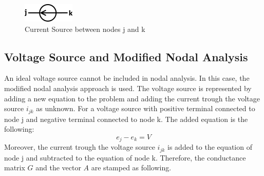 \begin{figure}[h]
	\centering
	\includegraphics[scale=0.8]{img/CurrentSource.png}
	\caption{Current Source between nodes j and k}
	\label{fig:CurrentSource}
\end{figure}

\subsection{Voltage Source and Modified Nodal Analysis} \label{IdealVoltageSource}
An ideal voltage source cannot be included in nodal analysis. In this case, the modified nodal analysis approach is used. The voltage source is represented by adding a new equation to the problem and adding the current trough the voltage source $i_{jk}$ as unknown. 
For a voltage source with positive terminal connected to node j and negative terminal connected to node k. The added equation is the following:
\begin{equation}
e_j - e_k = V
\end{equation}
Moreover, the current trough the voltage source $i_{jk}$ is added to the equation of node j and subtracted to the equation of node k.
Therefore, the conductance matrix $G$ and the vector $A$ are stamped as following.

